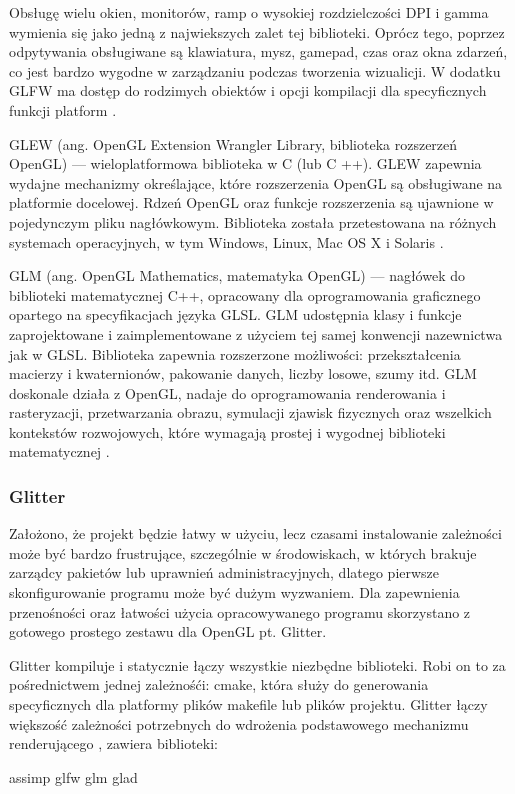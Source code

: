 Obsługę wielu okien, monitorów, ramp o wysokiej rozdzielczości DPI i gamma wymienia się jako jedną z najwiekszych zalet tej biblioteki. Oprócz tego, poprzez odpytywania obsługiwane są klawiatura, mysz, gamepad, czas oraz okna zdarzeń, co jest bardzo wygodne w zarządzaniu podczas tworzenia wizualicji. W dodatku GLFW ma dostęp do rodzimych obiektów i opcji kompilacji dla specyficznych funkcji platform \cite{glfw}.

GLEW (ang. OpenGL Extension Wrangler Library, biblioteka rozszerzeń OpenGL) --- wieloplatformowa biblioteka w C (lub C ++). GLEW zapewnia wydajne mechanizmy określające, które rozszerzenia OpenGL są obsługiwane na platformie docelowej. Rdzeń OpenGL oraz funkcje rozszerzenia są ujawnione w pojedynczym pliku nagłówkowym. Biblioteka została przetestowana na różnych systemach operacyjnych, w tym Windows, Linux, Mac OS X i Solaris \cite{glew}.

GLM (ang. OpenGL Mathematics, matematyka OpenGL) --- nagłówek do biblioteki matematycznej C++, opracowany dla oprogramowania graficznego opartego na specyfikacjach języka GLSL. GLM udostępnia klasy i funkcje zaprojektowane i zaimplementowane z użyciem tej samej konwencji nazewnictwa jak w GLSL. Biblioteka zapewnia rozszerzone możliwości: przekształcenia macierzy i kwaternionów, pakowanie danych, liczby losowe, szumy itd. GLM doskonale działa z OpenGL, nadaje do oprogramowania renderowania i rasteryzacji, przetwarzania obrazu, symulacji zjawisk fizycznych oraz wszelkich kontekstów rozwojowych, które wymagają prostej i wygodnej biblioteki matematycznej \cite{glm}. 

\subsubsection{Glitter}
Założono, że projekt będzie łatwy w użyciu, lecz czasami instalowanie zależności może być bardzo frustrujące, szczególnie w środowiskach, w których brakuje zarządcy pakietów lub uprawnień administracyjnych, dlatego pierwsze skonfigurowanie programu może być dużym wyzwaniem.
Dla zapewnienia przenośności oraz łatwości użycia opracowywanego programu skorzystano z gotowego prostego zestawu dla OpenGL pt. Glitter.

Glitter kompiluje i statycznie łączy wszystkie niezbędne biblioteki. Robi on to za pośrednictwem jednej zależnośći: cmake, która służy do generowania specyficznych dla platformy plików makefile lub plików projektu. Glitter łączy większość zależności potrzebnych do wdrożenia podstawowego mechanizmu renderującego \cite{glitter}, zawiera biblioteki:
\begin{itemize}
\itemi assimp
\itemi glfw
\itemi glm
\itemi glad
\end{itemize}

